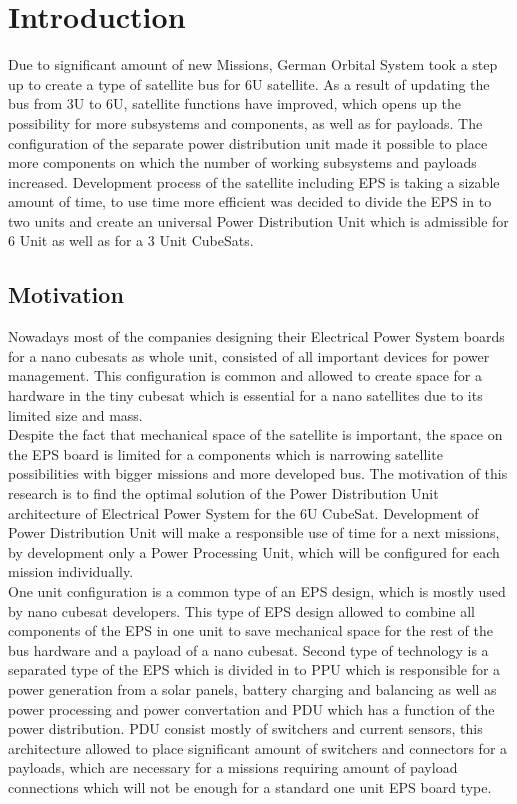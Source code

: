 \chapter{Introduction\label{cha:chapter1}}
Due to significant amount of new Missions, German Orbital System took a step up to create a type of satellite bus for 6U satellite.  As a result of updating the bus from 3U to 6U, satellite functions have improved, which opens up the possibility for more subsystems and components, as well as for payloads. The configuration of the separate power distribution unit made it possible to place more components on which the number of working subsystems and payloads increased. Development process of the satellite including EPS is taking a sizable amount of time, to use time more efficient was decided to divide the EPS in to two units and create an universal Power Distribution Unit which is admissible for 6 Unit as well as for a 3 Unit CubeSats. 
 

\section{Motivation\label{sec:moti}}
Nowadays most of the companies designing their Electrical Power System boards for a nano cubesats as whole unit, consisted of all important devices for power management. This configuration is common and allowed to create space for a hardware in the tiny cubesat which is essential for a nano satellites due to its limited size and mass. 
\\  Despite the fact that mechanical space of the satellite is important, the space on the EPS board is limited for a components which is narrowing satellite possibilities with bigger missions and more developed bus. 
The motivation of this research is to find the optimal solution of the Power Distribution Unit architecture of Electrical Power System for the 6U CubeSat. Development of Power Distribution Unit will make a responsible use of time for a next missions, by development only a Power Processing Unit, which will be configured for each mission individually.\\
One unit configuration is a common type of an EPS design, which is mostly used by nano cubesat developers. This type of EPS design allowed to combine all components of the EPS in one unit to save mechanical space for the rest of the bus hardware and a payload of a nano cubesat. Second type of technology is a separated type of the EPS which is divided in to PPU which is responsible for a power generation from a solar panels, battery charging and balancing as well as power processing and power convertation and PDU which has a function of the power distribution. PDU consist mostly of switchers and current sensors, this architecture allowed to place significant amount of switchers and connectors for a payloads, which are necessary for a missions requiring amount of payload connections which will not be enough for a standard one unit EPS board type. \\

